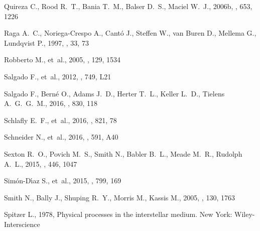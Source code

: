 \documentclass[useAMS, usenatbib, a4paper]{mnras}
\begin{document}
\begin{thebibliography}{}
{Quireza} C.,  {Rood} R.~T.,  {Bania} T.~M.,  {Balser} D.~S.,   {Maciel} W.~J.,
   2006b, \apj, 653, 1226

{Raga} A.~C.,  {Noriega-Crespo} A.,  {Cantó} J.,  {Steffen} W.,  {van Buren}
  D.,  {Mellema} G.,   {Lundqvist} P.,  1997, \rmxaa, 33, 73

{Robberto} M.,  et~al., 2005, \aj, 129, 1534

{Salgado} F.,  et~al., 2012, \apjl, 749, L21

{Salgado} F.,  {Berné} O.,  {Adams} J.~D.,  {Herter} T.~L.,  {Keller} L.~D.,
  {Tielens} A.~G.~G.~M.,  2016, \apj, 830, 118

{Schlafly} E.~F.,  et~al., 2016, \apj, 821, 78

{Schneider} N.,  et~al., 2016, \aap, 591, A40

{Sexton} R.~O.,  {Povich} M.~S.,  {Smith} N.,  {Babler} B.~L.,  {Meade} M.~R.,
   {Rudolph} A.~L.,  2015, \mnras, 446, 1047

{Simón-D{\'{\i}}az} S.,  et~al., 2015, \apj, 799, 169

{Smith} N.,  {Bally} J.,  {Shuping} R.~Y.,  {Morris} M.,   {Kassis} M.,  2005,
  \aj, 130, 1763

{Spitzer} L.,  1978, {Physical processes in the interstellar medium}.
New York: Wiley-Interscience


\end{thebibliography}
\end{document}
